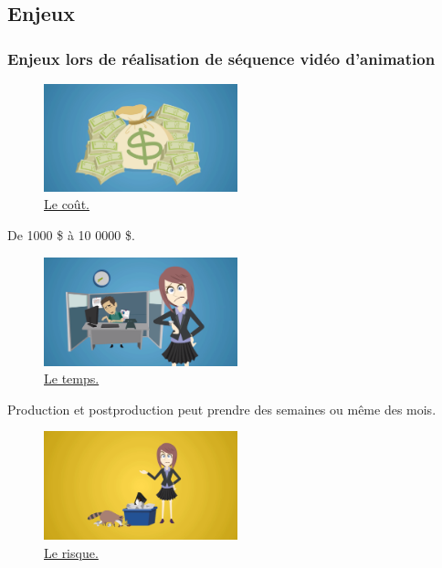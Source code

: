 \subsection{Enjeux} 
		\begin{frame}[allowframebreaks]
		 \frametitle{Enjeux lors de réalisation de séquence vidéo d'animation}
			\begin{figure}
                   
                      \centering
                     \includegraphics[width = 0.5\textwidth]{cout.png}
                     \caption{\tiny{\href{run:cout.png}{Le coût.}}}
                   \end{figure}
			
			
			
			
			\begin{description}
				\item[Coût] De 1000 \$ à 10 0000 \$.
			\end{description}
			\framebreak
			
			\begin{figure}
                     \centering
                     \includegraphics[width = 0.5\textwidth]{temps.png}
                     \caption{\tiny{\href{run:temps.png}{Le temps.}}}
                   \end{figure}
			
			
			\begin{description}
				\item[Temps] Production et postproduction peut prendre des semaines ou même des mois.
				
			\end{description}
			\framebreak
			
			\begin{figure}
                     \centering
                     \includegraphics[width = 0.5\textwidth]{risque.png}
                     \caption{\tiny{\href{run:risque.png}{Le risque.}}}
                   \end{figure}
			

\end{frame}
